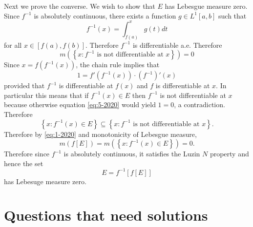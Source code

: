 \documentclass[answers]{exam}
\theoremstyle{problemstyle}
\newcommand{\1}[1]{\textbf{1}_{\left[#1\right]}} %
\begin{document}
\begin{questions}
\begin{solution}
  Next we prove the converse. We wish to show that $E$ has Lebesgue measure zero. Since $f^{-1}$ is absolutely continuous, there exists a function $g\in L^{1}[a,b]$ such that
  \begin{equation*}
    f^{-1}(x) = \int_{f(a)}^{x}g(t)dt 
  \end{equation*}
  for all $x\in [f(a),f(b)]$. Therefore $f^{-1}$ is differentiable a.e. Therefore
  \begin{equation} \label{eq:1-2020}
    m \left( \left\{ x: f^{-1} \text{ is not differentiable at }x \right\} \right)  = 0
  \end{equation}
  Since $x = f(f^{-1}(x))$, the chain rule implies that
  \begin{equation} \label{eq:5-2020}
    1= f'(f^{-1}(x))\cdot (f^{-1})'(x)
  \end{equation}
  provided that $f^{-1}$ is differentiable at $f(x)$ and $f$ is differentiable
  at $x$. In particular this means that if $f^{-1}(x)\in E$ then $f^{-1}$ is not differentiable at $x$
  because otherwise equation \eqref{eq:5-2020} would yield $1=0$, a contradiction.
  Therefore
  \begin{equation*}
    \left\{ x: f^{-1}(x)\in E \right\} \subseteq  \left\{ x: f^{-1} \text{ is not differentiable at }x \right\}.
  \end{equation*}
  Therefore by \eqref{eq:1-2020} and monotonicity of Lebesgue measure,
  \begin{equation*}
    m(f[E])= m\left(\left\{ x:f^{-1}(x)\in E \right\}\right)=0.
  \end{equation*}
  Therefore since $f^{-1}$ is absolutely continuous, it satisfies the Luzin $N$
  property and hence the set
  \begin{equation*}
    E = f^{-1}[f[E]]
  \end{equation*}
  has Lebesuge measure zero.
\end{solution}







\newpage
\section{Questions that need solutions}


\end{questions}
\end{document}
